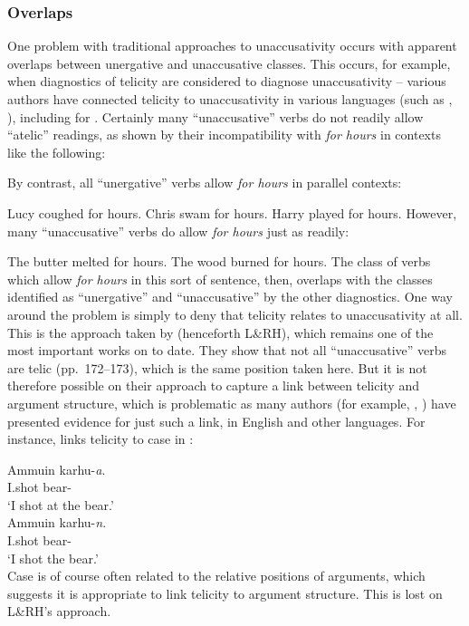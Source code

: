 \documentclass[output=paper]{langsci/langscibook}
\begin{document}
\subsubsection{Overlaps}\label{sec:baker:3.4.3}

One problem with traditional approaches to unaccusativity occurs with apparent
overlaps between unergative and unaccusative classes. This occurs, for example,
when diagnostics of telicity are considered to diagnose unaccusativity –
various authors have connected telicity to unaccusativity in various languages
(such as \citealt{Zaenen1988}, \citealt{Borer2005}), including
\citet[227]{Schoorlemmer2004} for . Certainly many
\enquote{unaccusative} verbs do not readily allow \enquote{atelic} readings, as
shown by their incompatibility with \emph{for hours} in contexts like the
following:

\ea
    \z
\z
By contrast, all \enquote{unergative} verbs allow \emph{for hours} in
parallel contexts:

\ea
    \ea Lucy coughed for hours.
    \ex Chris swam for hours.
    \ex Harry played for hours.
    \z
\z
However, many \enquote{unaccusative} verbs do allow \emph{for hours} just as
readily:

\ea
    \ea The butter melted for hours.
    \ex The wood burned for hours.
    \z
\z
The class of verbs which allow \emph{for hours} in this sort of sentence,
then, overlaps with the classes identified as \enquote{unergative} and
\enquote{unaccusative} by the other diagnostics. One way around the problem is
simply to deny that telicity relates to unaccusativity at all. This is the
approach taken by \citet{LevinRappaportHovav1995} (henceforth L\&RH), which
remains one of the most important works on  to date.  They
show that not all \enquote{unaccusative} verbs are telic (pp.\ 172--173), which is
the same position taken here. But it is not therefore possible on their
approach to capture a link between telicity and argument structure, which is
problematic as many authors (for example, \citealt{Tenny1987},
\citealt{Borer2005}) have presented evidence for just such a link, in English
and other languages. For instance, \citet{Kiparsky1998} links telicity to case
in :

\ea {}
    \ea
        \gll    Ammuin   karhu-\textit{a}.\\
               I.shot   bear-\Part\\
        \glt   \enquote*{I shot at the bear.}\\
    \ex
        \gll    Ammuin   karhu-\textit{n}.\\
                I.shot   bear-\Acc\\
        \glt   \enquote*{I shot the bear.}\\
    \z
\z
Case is of course often related to the relative positions of arguments, which
suggests it is appropriate to link telicity to argument structure. This is lost
on L\&RH’s approach.
\end{document}
